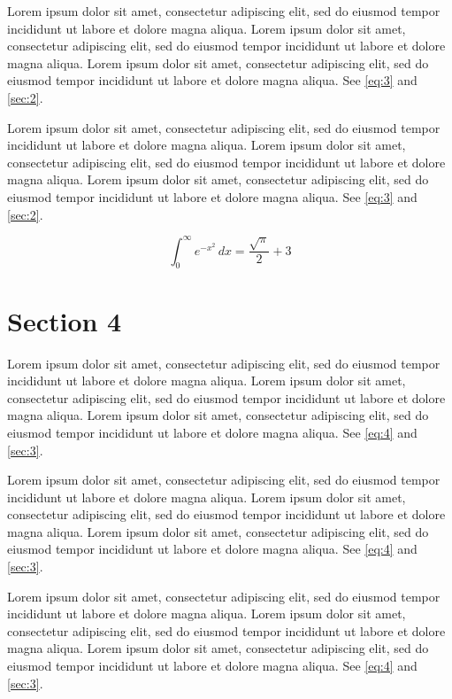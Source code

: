 \documentclass[11pt]{article}
\begin{document}
Lorem ipsum dolor sit amet, consectetur adipiscing elit, sed do eiusmod tempor incididunt ut labore et dolore magna aliqua. Lorem ipsum dolor sit amet, consectetur adipiscing elit, sed do eiusmod tempor incididunt ut labore et dolore magna aliqua. Lorem ipsum dolor sit amet, consectetur adipiscing elit, sed do eiusmod tempor incididunt ut labore et dolore magna aliqua. See \cref{eq:3} and \cref{sec:2}.

Lorem ipsum dolor sit amet, consectetur adipiscing elit, sed do eiusmod tempor incididunt ut labore et dolore magna aliqua. Lorem ipsum dolor sit amet, consectetur adipiscing elit, sed do eiusmod tempor incididunt ut labore et dolore magna aliqua. Lorem ipsum dolor sit amet, consectetur adipiscing elit, sed do eiusmod tempor incididunt ut labore et dolore magna aliqua. See \cref{eq:3} and \cref{sec:2}.

\begin{equation}\label{eq:3} \int_0^\infty e^{-x^2}\,dx = \frac{\sqrt{\pi}}{2} + 3\end{equation}
\section{Section 4}\label{sec:4}
Lorem ipsum dolor sit amet, consectetur adipiscing elit, sed do eiusmod tempor incididunt ut labore et dolore magna aliqua. Lorem ipsum dolor sit amet, consectetur adipiscing elit, sed do eiusmod tempor incididunt ut labore et dolore magna aliqua. Lorem ipsum dolor sit amet, consectetur adipiscing elit, sed do eiusmod tempor incididunt ut labore et dolore magna aliqua. See \cref{eq:4} and \cref{sec:3}.

Lorem ipsum dolor sit amet, consectetur adipiscing elit, sed do eiusmod tempor incididunt ut labore et dolore magna aliqua. Lorem ipsum dolor sit amet, consectetur adipiscing elit, sed do eiusmod tempor incididunt ut labore et dolore magna aliqua. Lorem ipsum dolor sit amet, consectetur adipiscing elit, sed do eiusmod tempor incididunt ut labore et dolore magna aliqua. See \cref{eq:4} and \cref{sec:3}.

Lorem ipsum dolor sit amet, consectetur adipiscing elit, sed do eiusmod tempor incididunt ut labore et dolore magna aliqua. Lorem ipsum dolor sit amet, consectetur adipiscing elit, sed do eiusmod tempor incididunt ut labore et dolore magna aliqua. Lorem ipsum dolor sit amet, consectetur adipiscing elit, sed do eiusmod tempor incididunt ut labore et dolore magna aliqua. See \cref{eq:4} and \cref{sec:3}.
\end{document}
